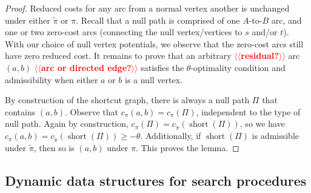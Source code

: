 \documentclass[a4paper,UKenglish]{socg-lipics-v2018}
\makeatletter
\def\short{\operatorname{short}}
\theoremstyle{plain}
\numberwithin{figure}{section}
\def\n@te#1{\textsf{\boldmath \textbf{$\langle\!\langle$#1$\rangle\!\rangle$}}\leavevmode}
\def\note#1{\textcolor{red}{\n@te{#1}}}
\makeatother
\begin{document}
\begin{proof}
Reduced costs for any arc from a normal vertex another is unchanged under either
$\tilde{\pi}$ or $\pi$.
Recall that a null path is comprised of one $A$-to-$B$ arc, and one or two
zero-cost arcs (connecting the null vertex/vertices to $s$ and/or $t$).
With our choice of null vertex potentials, we observe that the zero-cost arcs
still have zero reduced cost.
It remains to prove that an arbitrary \note{residual?} arc $(a, b)$ \note{arc or directed edge?} satisfies the $\theta$-optimality condition and admissibility when either $a$ or $b$ is a null vertex.

By construction of the shortcut graph,
there is always a null path $\Pi$ that contains $(a, b)$.
Observe that $c_\pi(a, b) = c_\pi(\Pi)$, independent to the type of null path.
Again by construction, $c_\pi(\Pi) = c_{\tilde{\pi}}(\short(\Pi))$, so we have
$c_\pi(a, b) = c_{\tilde{\pi}}(\short(\Pi)) \geq -\theta$.
Additionally, if $\short(\Pi)$ is admissible under $\tilde{\pi}$, then so is
$(a, b)$ under $\pi$.
%
This proves the lemma.
\end{proof}


\subsection{Dynamic data structures for search procedures}
\label{SS:ds-search}
\end{document}
